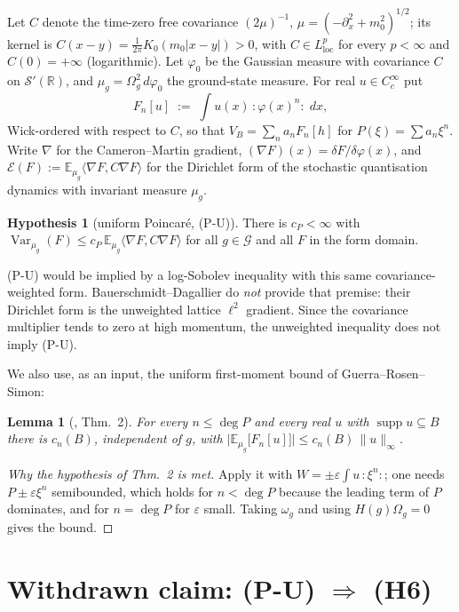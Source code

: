\documentclass[11pt,a4paper]{article}
\theoremstyle{plain}
\newtheorem{lemma}[theorem]{Lemma}
\theoremstyle{definition}
\newtheorem{hypothesis}[theorem]{Hypothesis}
\newcommand{\R}{\mathbb{R}}
\newcommand{\Om}{\Omega}
\newcommand{\E}{\mathbb{E}}
\newcommand{\ip}[2]{\langle #1,#2\rangle}
\DeclareMathOperator{\Var}{Var}
\DeclareMathOperator{\supp}{supp}
\begin{document}
Let $C$ denote the time-zero free covariance $(2\mu)^{-1}$, $\mu=(-\partial_x^2+m_0^2)^{1/2}$;
its kernel is $C(x-y)=\tfrac1{2\pi}K_0(m_0|x-y|)>0$, with $C\in L^p_{\mathrm{loc}}$ for every
$p<\infty$ and $C(0)=+\infty$ (logarithmic). Let $\varphi_0$ be the Gaussian measure with
covariance $C$ on $\mathcal S'(\R)$, and $\mu_g=\Om_g^2\,d\varphi_0$ the ground-state measure.
For real $u\in C_c^\infty$ put
\[
  F_n[u]\;:=\;\int u(x)\,{:}\varphi(x)^n{:}\;dx ,
\]
Wick-ordered with respect to $C$, so that $V_B=\sum_n a_nF_n[h]$ for $P(\xi)=\sum a_n\xi^n$.
Write $\nabla$ for the Cameron--Martin gradient, $(\nabla F)(x)=\delta F/\delta\varphi(x)$, and
$\mathcal E(F):=\E_{\mu_g}\ip{\nabla F}{C\nabla F}$ for the Dirichlet form of the stochastic
quantisation dynamics with invariant measure $\mu_g$.

\begin{hypothesis}[uniform Poincar\'e, (P-U)]\label{hyp:PU}
There is $c_P<\infty$ with
$\Var_{\mu_g}(F)\le c_P\,\E_{\mu_g}\ip{\nabla F}{C\nabla F}$
for all $g\in\mathcal G$ and all $F$ in the form domain.
\end{hypothesis}

(P-U) would be implied by a log-Sobolev inequality with this same covariance-weighted form.
Bauerschmidt--Dagallier \cite{BD} do \emph{not} provide that premise: their Dirichlet form is the
unweighted lattice $\ell^2$ gradient.  Since the covariance multiplier tends to zero at high
momentum, the unweighted inequality does not imply (P-U).

We also use, as an input, the uniform first-moment bound of Guerra--Rosen--Simon:

\begin{lemma}[\cite{GRS72}, Thm.~2]\label{lem:first}
For every $n\le\deg P$ and every real $u$ with $\supp u\subseteq B$ there is $c_n(B)$,
independent of $g$, with $\bigl|\E_{\mu_g}\bigl[F_n[u]\bigr]\bigr|\le c_n(B)\,\|u\|_\infty$.
\end{lemma}

\begin{proof}[Why the hypothesis of \cite{GRS72} Thm.~2 is met]
Apply it with $W=\pm\varepsilon\int u\,{:}\xi^n{:}$; one needs $P\pm\varepsilon\xi^n$ semibounded,
which holds for $n<\deg P$ because the leading term of $P$ dominates, and for $n=\deg P$ for
$\varepsilon$ small. Taking $\omega_g$ and using $H(g)\Om_g=0$ gives the bound.
\end{proof}

\section{Withdrawn claim: (P-U) $\Rightarrow$ (H6)}\label{sec:main}
\end{document}
